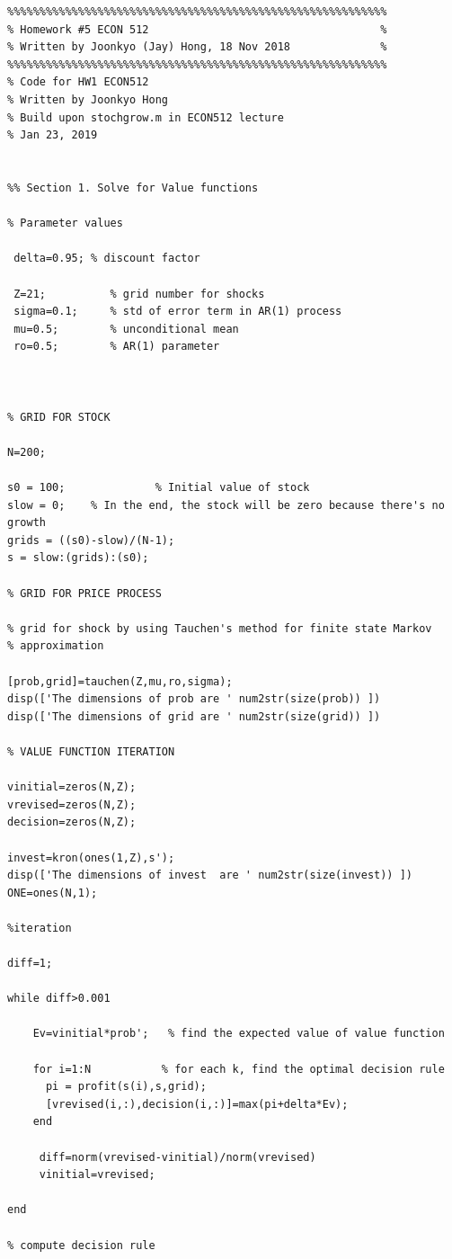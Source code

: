 \documentclass[10pt, letterpaper]{article}
\begin{document}
\begin{verbatim}
%%%%%%%%%%%%%%%%%%%%%%%%%%%%%%%%%%%%%%%%%%%%%%%%%%%%%%%%%%%
% Homework #5 ECON 512                                    %
% Written by Joonkyo (Jay) Hong, 18 Nov 2018              %
%%%%%%%%%%%%%%%%%%%%%%%%%%%%%%%%%%%%%%%%%%%%%%%%%%%%%%%%%%%
% Code for HW1 ECON512
% Written by Joonkyo Hong
% Build upon stochgrow.m in ECON512 lecture
% Jan 23, 2019


%% Section 1. Solve for Value functions

% Parameter values

 delta=0.95; % discount factor
  
 Z=21;          % grid number for shocks
 sigma=0.1;     % std of error term in AR(1) process
 mu=0.5;        % unconditional mean 
 ro=0.5;        % AR(1) parameter 
 
 

% GRID FOR STOCK

N=200;

s0 = 100;              % Initial value of stock 
slow = 0;    % In the end, the stock will be zero because there's no growth
grids = ((s0)-slow)/(N-1);
s = slow:(grids):(s0);

% GRID FOR PRICE PROCESS

% grid for shock by using Tauchen's method for finite state Markov
% approximation

[prob,grid]=tauchen(Z,mu,ro,sigma);
disp(['The dimensions of prob are ' num2str(size(prob)) ])
disp(['The dimensions of grid are ' num2str(size(grid)) ])

% VALUE FUNCTION ITERATION

vinitial=zeros(N,Z);
vrevised=zeros(N,Z);
decision=zeros(N,Z);
  
invest=kron(ones(1,Z),s');
disp(['The dimensions of invest  are ' num2str(size(invest)) ])
ONE=ones(N,1);
 
%iteration

diff=1;

while diff>0.001
    
    Ev=vinitial*prob';   % find the expected value of value function
      
    for i=1:N           % for each k, find the optimal decision rule
      pi = profit(s(i),s,grid);  
      [vrevised(i,:),decision(i,:)]=max(pi+delta*Ev);
    end
    
     diff=norm(vrevised-vinitial)/norm(vrevised)
     vinitial=vrevised;
    
end

% compute decision rule


\end{verbatim}
\end{document}
